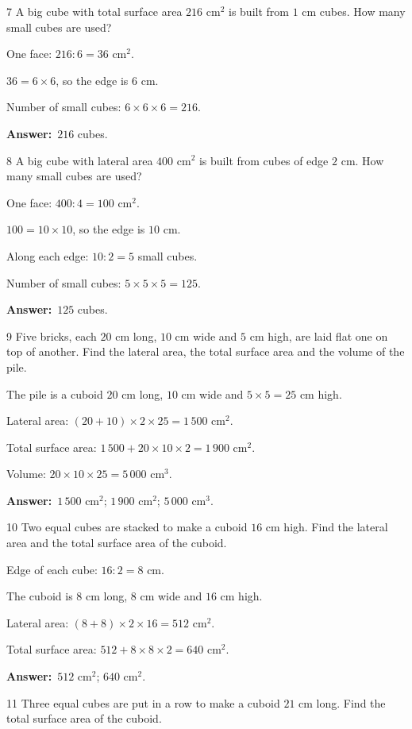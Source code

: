 \documentclass[11pt]{article}
\newif\ifsol \solfalse
\providecommand{\AnsWord}{Đáp số}
\newcommand{\dapso}[1]{\par\textbf{\AnsWord:}\ #1}
\newcommand{\probsol}[1]{%
  \begin{lrbox}{\solmeasure}\begin{minipage}{\dimexpr\linewidth-24pt\relax}#1\end{minipage}\end{lrbox}%
  \ifsol
    \begin{solbox}#1\end{solbox}%
  \else
    \setlength{\solht}{\dimexpr\ht\solmeasure+\dp\solmeasure+0.85cm\relax}%
    \ifdim\solht<1.35cm\setlength{\solht}{1.35cm}\fi
    \begin{tcolorbox}[colback=white,colframe=Line,boxrule=0.8pt,arc=5pt,
      left=8pt,right=8pt,top=4pt,bottom=4pt,height=\solht]{\footnotesize\color{Slate}\itshape\WorkWord}\end{tcolorbox}%
  \fi}
\newcommand{\gap}{\vspace{0.3cm}}
\def\WorkWord{Your work:}
\def\AnsWord{Answer}
\begin{document}
\gap
\begin{probbox}{7}{\relax}
A big cube with total surface area $216$ cm$^2$ is built from $1$ cm cubes. How many small cubes are used?
\end{probbox}
\probsol{
One face: $216:6=36$ cm$^2$.\par
$36=6\times6$, so the edge is $6$ cm.\par
Number of small cubes: $6\times6\times6=216$.
\dapso{$216$ cubes.}}
\gap
\begin{probbox}{8}{\relax}
A big cube with lateral area $400$ cm$^2$ is built from cubes of edge $2$ cm. How many small cubes are used?
\end{probbox}
\probsol{
One face: $400:4=100$ cm$^2$.\par
$100=10\times10$, so the edge is $10$ cm.\par
Along each edge: $10:2=5$ small cubes.\par
Number of small cubes: $5\times5\times5=125$.
\dapso{$125$ cubes.}}
\gap
\begin{probbox}{9}{\relax}
Five bricks, each $20$ cm long, $10$ cm wide and $5$ cm high, are laid flat one on top of another. Find the lateral area, the total surface area and the volume of the pile.
\end{probbox}
\probsol{
The pile is a cuboid $20$ cm long, $10$ cm wide and $5\times5=25$ cm high.\par
Lateral area: $(20+10)\times2\times25=1\,500$ cm$^2$.\par
Total surface area: $1\,500+20\times10\times2=1\,900$ cm$^2$.\par
Volume: $20\times10\times25=5\,000$ cm$^3$.
\dapso{$1\,500$ cm$^2$; $1\,900$ cm$^2$; $5\,000$ cm$^3$.}}
\gap
\begin{probbox}{10}{\relax}
Two equal cubes are stacked to make a cuboid $16$ cm high. Find the lateral area and the total surface area of the cuboid.
\end{probbox}
\probsol{
Edge of each cube: $16:2=8$ cm.\par
The cuboid is $8$ cm long, $8$ cm wide and $16$ cm high.\par
Lateral area: $(8+8)\times2\times16=512$ cm$^2$.\par
Total surface area: $512+8\times8\times2=640$ cm$^2$.
\dapso{$512$ cm$^2$; $640$ cm$^2$.}}
\gap
\begin{probbox}{11}{\relax}
Three equal cubes are put in a row to make a cuboid $21$ cm long. Find the total surface area of the cuboid.
\end{probbox}
\end{document}
